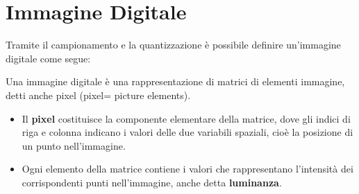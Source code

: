 \section{Immagine Digitale}
Tramite il campionamento e la quantizzazione è possibile definire
un’immagine digitale come segue:
\begin{definition}
    Una immagine digitale è una rappresentazione di matrici di
    elementi immagine, detti anche pixel (pixel= picture elements).
\end{definition}
\begin{itemize}
    \item Il \textbf{pixel} costituisce la componente elementare della matrice,
          dove gli indici di riga e colonna indicano i valori delle due
          variabili spaziali, cioè la posizione di un punto nell’immagine.
    \item Ogni elemento della matrice contiene i valori che
          rappresentano l’intensità dei corrispondenti punti
          nell’immagine, anche detta \textbf{luminanza}.
\end{itemize}

